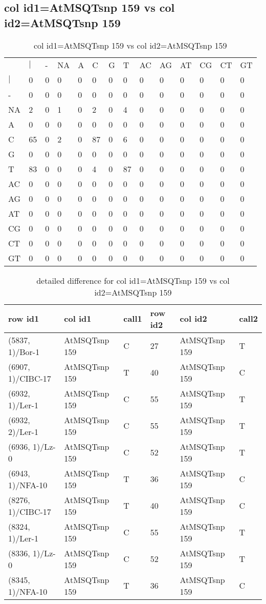 \subsection{col id1=AtMSQTsnp 159 vs col id2=AtMSQTsnp 159}
\begin{center}
\begin{longtable}{|l|l|l|l|l|l|l|l|l|l|l|l|l|l|}
\caption{col id1=AtMSQTsnp 159 vs col id2=AtMSQTsnp 159} \label{table_dm738}\\
\hline
\\
\hline
&$|$&-&NA&A&C&G&T&AC&AG&AT&CG&CT&GT\\
$|$&0&0&0&0&0&0&0&0&0&0&0&0&0\\
-&0&0&0&0&0&0&0&0&0&0&0&0&0\\
NA&2&0&1&0&2&0&4&0&0&0&0&0&0\\
A&0&0&0&0&0&0&0&0&0&0&0&0&0\\
C&65&0&2&0&87&0&6&0&0&0&0&0&0\\
G&0&0&0&0&0&0&0&0&0&0&0&0&0\\
T&83&0&0&0&4&0&87&0&0&0&0&0&0\\
AC&0&0&0&0&0&0&0&0&0&0&0&0&0\\
AG&0&0&0&0&0&0&0&0&0&0&0&0&0\\
AT&0&0&0&0&0&0&0&0&0&0&0&0&0\\
CG&0&0&0&0&0&0&0&0&0&0&0&0&0\\
CT&0&0&0&0&0&0&0&0&0&0&0&0&0\\
GT&0&0&0&0&0&0&0&0&0&0&0&0&0\\
\hline
\end{longtable}
\end{center}

\begin{center}
\begin{longtable}{|l|l|l|l|l|l|}
\caption{detailed difference for col id1=AtMSQTsnp 159 vs col id2=AtMSQTsnp 159} \label{table_dm739}\\
\hline
row id1&col id1&call1&row id2&col id2&call2\\
\hline
(5837, 1)/Bor-1&AtMSQTsnp 159&C&27&AtMSQTsnp 159&T\\
(6907, 1)/CIBC-17&AtMSQTsnp 159&T&40&AtMSQTsnp 159&C\\
(6932, 1)/Ler-1&AtMSQTsnp 159&C&55&AtMSQTsnp 159&T\\
(6932, 2)/Ler-1&AtMSQTsnp 159&C&55&AtMSQTsnp 159&T\\
(6936, 1)/Lz-0&AtMSQTsnp 159&C&52&AtMSQTsnp 159&T\\
(6943, 1)/NFA-10&AtMSQTsnp 159&T&36&AtMSQTsnp 159&C\\
(8276, 1)/CIBC-17&AtMSQTsnp 159&T&40&AtMSQTsnp 159&C\\
(8324, 1)/Ler-1&AtMSQTsnp 159&C&55&AtMSQTsnp 159&T\\
(8336, 1)/Lz-0&AtMSQTsnp 159&C&52&AtMSQTsnp 159&T\\
(8345, 1)/NFA-10&AtMSQTsnp 159&T&36&AtMSQTsnp 159&C\\
\hline
\end{longtable}
\end{center}

